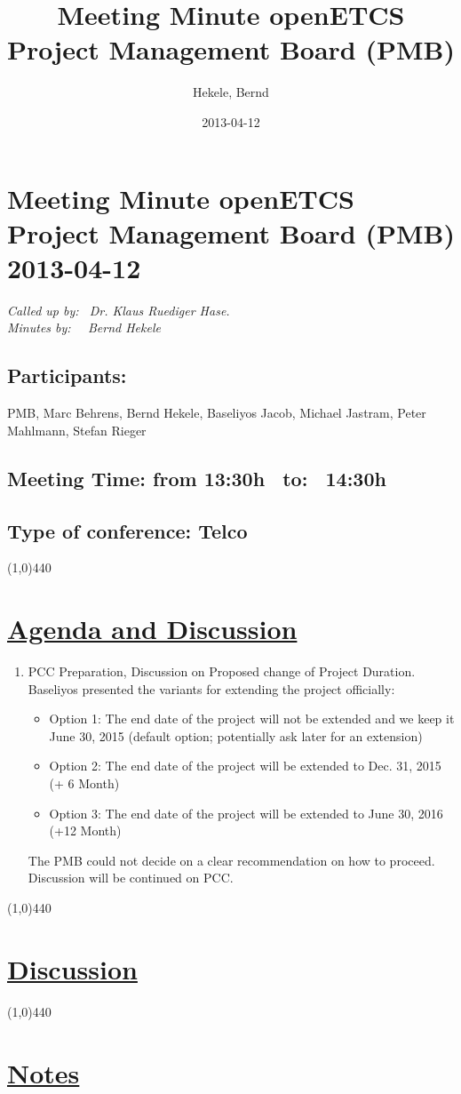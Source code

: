 \documentclass[a4paper]{article}
\title{Meeting Minute openETCS Project Management Board (PMB)}
\author{Hekele, Bernd}
\date{2013-04-12}
\begin{document}
\section*{\large{Meeting Minute openETCS Project Management Board (PMB) 2013-04-12}}

\emph{Called up by: \ Dr. Klaus Ruediger Hase.}\\
\emph{Minutes by: \ \  Bernd Hekele}


\subsection*{Participants:} PMB, 
Marc Behrens, 
Bernd Hekele,
Baseliyos Jacob,
Michael Jastram, 
Peter Mahlmann, 
Stefan Rieger\\



\subsection*{Meeting Time: from 13:30h \ to: \ 14:30h}

\subsection*{Type of conference: Telco}

\line(1,0){440}
\section*{\underline{Agenda and Discussion}}
\begin{enumerate}

\item PCC Preparation, Discussion on Proposed change of Project Duration.\\
Baseliyos presented the variants for extending the project officially:
\begin{itemize}
\item Option 1:  The end date of the project will not be extended and we keep it June 30, 2015 (default option; potentially ask later for an extension)
\item Option 2:  The end date of the project will be extended to Dec. 31, 2015 (+ 6 Month)
\item Option 3:  The end date of the project will be extended to June 30, 2016 (+12 Month)
\end{itemize}
The PMB could not decide on a clear recommendation on how to proceed. Discussion will be continued on PCC.\\
\end{enumerate}
\line(1,0){440}
\section*{\underline{Discussion}}

\line(1,0){440}
\section*{\underline{Notes}}
\end{document}
